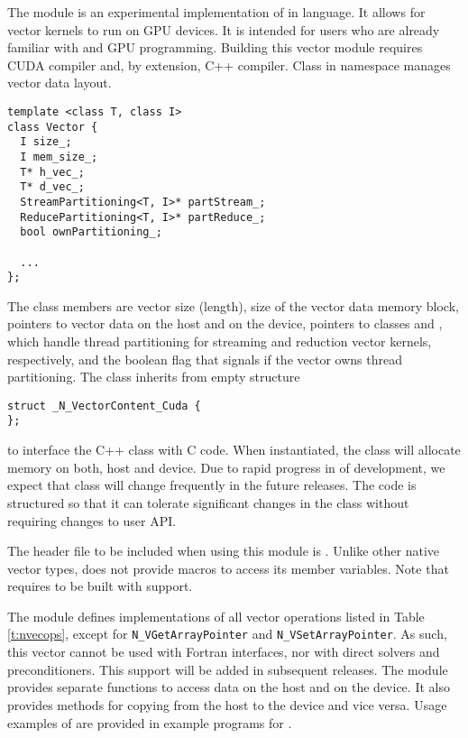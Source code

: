 %
The {\nveccuda} module is an experimental implementation of {\nvector} in {\cuda} language. 
It allows for {\sundials} vector kernels to run on GPU devices. It is intended for users 
who are already familiar with {\cuda} and GPU programming. Building this vector 
module requires CUDA compiler and, by extension, C++ compiler. Class  
in namespace  manages vector data layout. 
\begin{verbatim} 
template <class T, class I>
class Vector {
  I size_;
  I mem_size_;
  T* h_vec_;
  T* d_vec_;
  StreamPartitioning<T, I>* partStream_;
  ReducePartitioning<T, I>* partReduce_;
  bool ownPartitioning_;
  
  ...
};
\end{verbatim}
The class members are vector size (length), size of the vector data memory block, pointers
to vector data on the host and on the device, pointers to classes 
and , which handle thread partitioning for streaming and 
reduction vector kernels, respectively, and the boolean flag that signals if the
vector owns thread partitioning. The class  inherits from empty structure
\begin{verbatim} 
struct _N_VectorContent_Cuda {
};
\end{verbatim}
to interface the C++ class with {\nvector} C code. When instantiated, the class
 will allocate memory on both, host and device. Due to rapid
progress in of {\cuda} development, we expect that 
class will change frequently in the future {\sundials} releases. The code is
structured so that it can tolerate significant changes in the 
 class without requiring changes to user API.


The header file to be included when using this module is .
Unlike other native {\sundials} vector types, {\nveccuda} does not provide macros 
to access its member variables.
Note that {\nveccuda} requires {\sundials} to be built with {\mpi} support.


The {\nveccuda} module defines implementations of all vector operations listed 
in Table \ref{t:nvecops}, except for \verb|N_VGetArrayPointer| and 
\verb|N_VSetArrayPointer|. 
As such, this vector cannot be used with {\sundials} Fortran interfaces,
nor with {\sundials} direct solvers and preconditioners. This support
will be added in subsequent {\sundials} releases. 
The {\nveccuda} module provides separate functions to access data on the host
and on the device. It also provides methods for copying from the host to 
the device and vice versa. Usage examples of {\nveccuda} are provided in
example programs for {\cvode} \cite{cvode_ex}.

